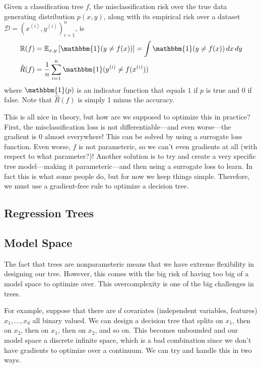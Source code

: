   \begin{theorem}
    Given a classification tree $f$, the misclassification risk over the true data generating distribution $p(x, y)$, along with its empirical risk over a dataset $\mathcal{D} = (x^{(i)}, y^{(i)})_{i=1}^n$, is 
    \begin{align}
      \mathbb{R}(f) & = \mathbb{E}_{x, y} \left[ \mathbbm{1} (y \neq f(x))\right] = \int \mathbbm{1} (y \neq f(x)) \, dx \,dy \\ 
      \hat{R}(f) & = \frac{1}{n} \sum_{i=1}^n \mathbbm{1} (y^{(i)} \neq f(x^{(i)}))
    \end{align}
    where $\mathbbm{1}(p)$ is an indicator function that equals $1$ if $p$ is true and $0$ if false. Note that $\hat{R}(f)$ is simply 1 minus the accuracy. 
  \end{theorem} 

  This is all nice in theory, but how are we supposed to optimize this in practice? First, the misclassification loss is not differentiable---and even worse---the gradient is $0$ almost everywhere! This can be solved by using a surrogate loss function. Even worse, $f$ is not parameteric, so we can't even gradients at all (with respect to what parameter?)! Another solution is to try and create a very specific tree model---making it parameteric---and then using a surrogate loss to learn. In fact this is what some people do, but for now we keep things simple. Therefore, we must use a gradient-free rule to optimize a decision tree. 

\subsection{Regression Trees}

\subsection{Model Space} 

  The fact that trees are nonparameteric means that we have extreme flexibility in designing our tree. However, this comes with the big risk of having too big of a model space to optimize over. This overcomplexity is one of the big challenges in trees. 

  For example, suppose that there are $d$ covariates (independent variables, features) $x_1, \ldots, x_d$ all binary valued. We can design a decision tree that splits on $x_1$, then on $x_2$, then on $x_1$, then on $x_2$, and so on. This becomes unbounded and our model space a discrete infinite space, which is a bad combination since we don't have gradients to optimize over a continuum. We can try and handle this in two ways. 

